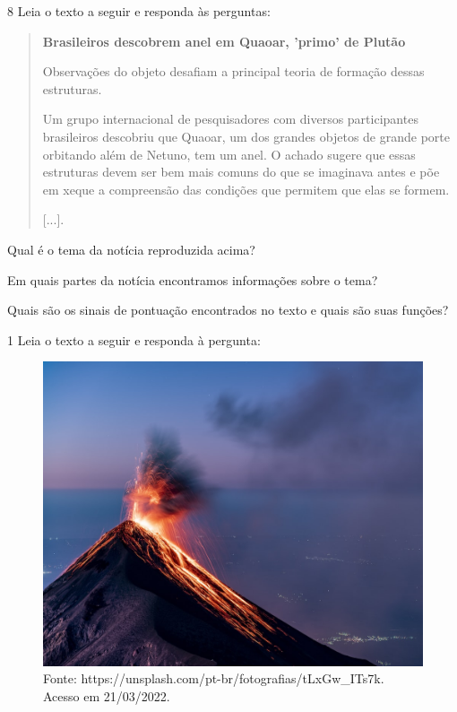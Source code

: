 \num{8} Leia o texto a seguir e responda às perguntas:

\begin{quote}
\textbf{Brasileiros descobrem anel em Quaoar, 'primo' de Plutão}

Observações do objeto desafiam a principal teoria de formação
dessas estruturas.

Um grupo internacional de pesquisadores com diversos participantes
brasileiros descobriu que Quaoar, um dos grandes objetos de grande porte
orbitando além de Netuno, tem um anel. O achado sugere que essas
estruturas devem ser bem mais comuns do que se imaginava antes e põe em
xeque a compreensão das condições que permitem que elas se formem.

{[}...{]}.

\end{quote}

\begin{escolha}
\item Qual é o tema da notícia reproduzida acima?



\item Em quais partes da notícia encontramos informações sobre o tema?


\item Quais são os sinais de pontuação encontrados no texto e quais são
suas funções?

\end{escolha}



\num{1} Leia o texto a seguir e responda à pergunta:

\begin{figure}[htpb!]
\includegraphics[width=.5\textwidth]{./imgs/img9.jpg}
\caption{Fonte: https://unsplash.com/pt-br/fotografias/tLxGw\_ITs7k. Acesso em 21/03/2022.}
\end{figure}

